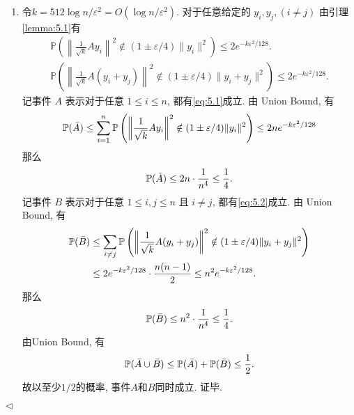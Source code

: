 \documentclass[11pt]{article}
\newenvironment{answer}[1][Solution]{\begin{trivlist}
    \item[\hskip \labelsep {\bfseries #1.}\hskip \labelsep]}{\hfill$\lhd$\end{trivlist}}
\newcommand\1{\mathds{1}}
\newcommand\PP{\mathbb{P}}
\begin{document}
\begin{answer}
    \begin{enumerate}[label=(\arabic*)]
        \item 令$k =512 \log n/\varepsilon^2 =  O(\log n/\varepsilon^2)$. 对于任意给定的 $y_i, y_j, (i\neq j)$ 由引理\eqref{lemma:5.1}有
        \begin{align*}
            \PP\left(\left\| \frac{1}{\sqrt{k}} Ay_i \right\|^2 \notin (1\pm\varepsilon/4)\| y_i\|^2\right) \le 2e^{-k\varepsilon^2/128}. \\
            \PP\left(\left\| \frac{1}{\sqrt{k}} A(y_i + y_j) \right\|^2 \notin (1\pm\varepsilon/4)\| y_i + y_j\|^2\right) \le 2e^{-k\varepsilon^2/128}.
        \end{align*}
        记事件 $A$ 表示对于任意 $1\le i\le n$, 都有\eqref{eq:5.1}成立. 由 Union Bound, 有
        \begin{align*}
            \PP(\Bar{A}) \le \sum_{i=1}^{n} \PP\left(\left\| \frac{1}{\sqrt{k}} Ay_i \right\|^2 \notin (1\pm\varepsilon/4)\| y_i\|^2\right) \le 2ne^{-k\varepsilon^2/128} 
        \end{align*}
        那么
        \begin{align*}
            \PP(\Bar{A}) \le 2n \cdot \frac{1}{n^4} \le \frac{1}{4}.
        \end{align*}
        记事件 $B$ 表示对于任意 $1\le i,j\le n$ 且 $i\neq j$, 都有\eqref{eq:5.2}成立. 由 Union Bound, 有
        \begin{align*}
            \PP(\Bar{B}) &\le \sum_{i\neq j} \PP\left(\left\| \frac{1}{\sqrt{k}} A(y_i + y_j) \right\|^2 \notin (1\pm\varepsilon/4)\| y_i + y_j\|^2\right) \\
            &\le 2e^{-k\varepsilon^2/128}\cdot \frac{n(n-1)}{2} \le n^2 e^{-k\varepsilon^2/128}.
        \end{align*}
        那么
        \begin{align*}
            \PP(\Bar{B}) \le n^2 \cdot \frac{1}{n^4} \le \frac{1}{4}.
        \end{align*}
        由Union Bound, 有
        \begin{align*}
            \PP(\Bar{A}\cup \Bar{B}) \le \PP(\Bar{A}) + \PP(\Bar{B}) \le \frac{1}{2}.
        \end{align*}
        故以至少$1/2$的概率, 事件$A$和$B$同时成立. 证毕.


\end{enumerate}
\end{answer}
\end{document}

